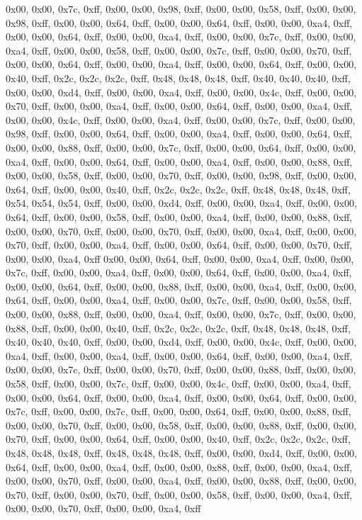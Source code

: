 0x00, 0x00, 0x7c, 0xff, 0x00, 0x00, 0x98, 0xff, 0x00, 0x00, 0x58, 0xff, 0x00, 0x00, 0x98, 0xff, 0x00, 0x00, 0x64, 0xff, 0x00, 0x00, 0x64, 0xff, 0x00, 0x00, 0xa4, 0xff, 0x00, 0x00, 0x64, 0xff, 0x00, 0x00, 0xa4, 0xff, 0x00, 0x00, 0x7c, 0xff, 0x00, 0x00, 0xa4, 0xff, 0x00, 0x00, 0x58, 0xff, 0x00, 0x00, 0x7c, 0xff, 0x00, 0x00, 0x70, 0xff, 0x00, 0x00, 0x64, 0xff, 0x00, 0x00, 0xa4, 0xff, 0x00, 0x00, 0x64, 0xff, 0x00, 0x00, 0x40, 0xff, 0x2c, 0x2c, 0x2c, 0xff, 0x48, 0x48, 0x48, 0xff, 0x40, 0x40, 0x40, 0xff, 0x00, 0x00, 0xd4, 0xff, 0x00, 0x00, 0xa4, 0xff, 0x00, 0x00, 0x4c, 0xff, 0x00, 0x00, 0x70, 0xff, 0x00, 0x00, 0xa4, 0xff, 0x00, 0x00, 0x64, 0xff, 0x00, 0x00, 0xa4, 0xff, 0x00, 0x00, 0x4c, 0xff, 0x00, 0x00, 0xa4, 0xff, 0x00, 0x00, 0x7c, 0xff, 0x00, 0x00, 0x98, 0xff, 0x00, 0x00, 0x64, 0xff, 0x00, 0x00, 0xa4, 0xff, 0x00, 0x00, 0x64, 0xff, 0x00, 0x00, 0x88, 0xff, 0x00, 0x00, 0x7c, 0xff, 0x00, 0x00, 0x64, 0xff, 0x00, 0x00, 0xa4, 0xff, 0x00, 0x00, 0x64, 0xff, 0x00, 0x00, 0xa4, 0xff, 0x00, 0x00, 0x88, 0xff, 0x00, 0x00, 0x58, 0xff, 0x00, 0x00, 0x70, 0xff, 0x00, 0x00, 0x98, 0xff, 0x00, 0x00, 0x64, 0xff, 0x00, 0x00, 0x40, 0xff, 0x2c, 0x2c, 0x2c, 0xff, 0x48, 0x48, 0x48, 0xff, 0x54, 0x54, 0x54, 0xff, 0x00, 0x00, 0xd4, 0xff, 0x00, 0x00, 0xa4, 0xff, 0x00, 0x00, 0x64, 0xff, 0x00, 0x00, 0x58, 0xff, 0x00, 0x00, 0xa4, 0xff, 0x00, 0x00, 0x88, 0xff, 0x00, 0x00, 0x70, 0xff, 0x00, 0x00, 0x70, 0xff, 0x00, 0x00, 0xa4, 0xff, 0x00, 0x00, 0x70, 0xff, 0x00, 0x00, 0xa4, 0xff, 0x00, 0x00, 0x64, 0xff, 0x00, 0x00, 0x70, 0xff, 0x00, 0x00, 0xa4, 0xff
0x00, 0x00, 0x64, 0xff, 0x00, 0x00, 0xa4, 0xff, 0x00, 0x00, 0x7c, 0xff, 0x00, 0x00, 0xa4, 0xff, 0x00, 0x00, 0x64, 0xff, 0x00, 0x00, 0xa4, 0xff, 0x00, 0x00, 0x64, 0xff, 0x00, 0x00, 0x88, 0xff, 0x00, 0x00, 0xa4, 0xff, 0x00, 0x00, 0x64, 0xff, 0x00, 0x00, 0xa4, 0xff, 0x00, 0x00, 0x7c, 0xff, 0x00, 0x00, 0x58, 0xff, 0x00, 0x00, 0x88, 0xff, 0x00, 0x00, 0xa4, 0xff, 0x00, 0x00, 0x7c, 0xff, 0x00, 0x00, 0x88, 0xff, 0x00, 0x00, 0x40, 0xff, 0x2c, 0x2c, 0x2c, 0xff, 0x48, 0x48, 0x48, 0xff, 0x40, 0x40, 0x40, 0xff, 0x00, 0x00, 0xd4, 0xff, 0x00, 0x00, 0x4c, 0xff, 0x00, 0x00, 0xa4, 0xff, 0x00, 0x00, 0xa4, 0xff, 0x00, 0x00, 0x64, 0xff, 0x00, 0x00, 0xa4, 0xff, 0x00, 0x00, 0x7c, 0xff, 0x00, 0x00, 0x70, 0xff, 0x00, 0x00, 0x88, 0xff, 0x00, 0x00, 0x58, 0xff, 0x00, 0x00, 0x7c, 0xff, 0x00, 0x00, 0x4c, 0xff, 0x00, 0x00, 0xa4, 0xff, 0x00, 0x00, 0x64, 0xff, 0x00, 0x00, 0xa4, 0xff, 0x00, 0x00, 0x64, 0xff, 0x00, 0x00, 0x7c, 0xff, 0x00, 0x00, 0x7c, 0xff, 0x00, 0x00, 0x64, 0xff, 0x00, 0x00, 0x88, 0xff, 0x00, 0x00, 0x70, 0xff, 0x00, 0x00, 0x58, 0xff, 0x00, 0x00, 0x88, 0xff, 0x00, 0x00, 0x70, 0xff, 0x00, 0x00, 0x64, 0xff, 0x00, 0x00, 0x40, 0xff, 0x2c, 0x2c, 0x2c, 0xff, 0x48, 0x48, 0x48, 0xff, 0x48, 0x48, 0x48, 0xff, 0x00, 0x00, 0xd4, 0xff, 0x00, 0x00, 0x64, 0xff, 0x00, 0x00, 0xa4, 0xff, 0x00, 0x00, 0x88, 0xff, 0x00, 0x00, 0xa4, 0xff, 0x00, 0x00, 0x70, 0xff, 0x00, 0x00, 0xa4, 0xff, 0x00, 0x00, 0x88, 0xff, 0x00, 0x00, 0x70, 0xff, 0x00, 0x00, 0x70, 0xff, 0x00, 0x00, 0x58, 0xff, 0x00, 0x00, 0xa4, 0xff, 0x00, 0x00, 0x70, 0xff, 0x00, 0x00, 0xa4, 0xff

